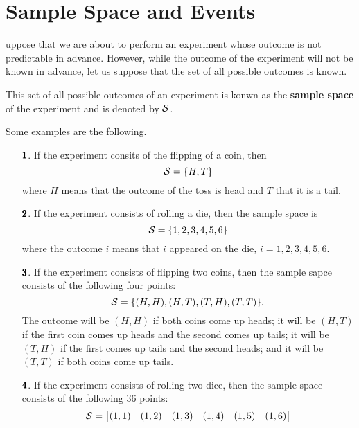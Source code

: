 \section{Sample Space and Events}

uppose that we are about to perform an experiment whose outcome is not predictable in advance. However, while the outcome of the experiment will not be known in advance, let us suppose that the set of all possible outcomes is known. 

\begin{definition}
    This set of all possible outcomes of an experiment is konwn as the \textbf{sample space} of the experiment and is denoted by $\mathcal{S}$.
\end{definition}

Some examples are the following.
\begin{enumerate}
    \item[$\pmb{1}$.] If the experiment consits of the flipping of a coin, then
    \begin{equation*}
        \mathcal{S} = \{H, T\}
    \end{equation*}
    where $H$ means that the outcome of the toss is head and $T$ that it is a tail.
    \item[$\pmb{2}$.] If the experiment consists of  rolling a die, then the sample space is 
    \begin{equation*}
        \mathcal{S} = \{1,2,3,4,5,6\}
    \end{equation*}
    where the outcome $i$ means that $i$ appeared on the die, $i = 1,2,3,4,5,6$.
    \item[$\pmb{3}$.] If the experiment consists of flipping two coins, then the sample sapce consists of the following four points:
    \begin{equation*}
        \mathcal{S} = \{(H,H), (H,T), (T, H), (T,T)\}.
    \end{equation*}
    The outcome will be $(H,H)$ if both coins come up heads; it will be $(H,T)$ if the first coin comes up heads and the second comes up tails; it will be $(T,H)$ if the first comes up tails and the second heads; and it will be $(T,T)$ if both coins come up tails.
    \item[$\pmb{4}$.] If the experiment consists of rolling two dice, then the sample space consists of the following $36$ points:
    \begin{equation*}
        \mathcal{S} = \begin{bmatrix}
            (1,1) & (1,2) & (1,3) & (1,4) & (1,5) & (1,6) \\ 

\end{bmatrix}
\end{equation*}
\end{enumerate}
